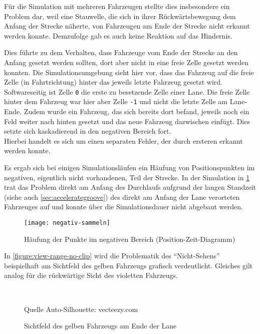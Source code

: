Für die Simulation mit mehreren Fahrzeugen stellte dies insbesondere ein Problem dar, weil eine Stauwelle, die sich in ihrer Rückwärtsbewegung dem Anfang der Strecke näherte, von Fahrzeugen am Ende der Strecke nicht erkannt werden konnte.
Demzufolge gab es auch keine Reaktion auf das Hindernis.

Dies führte zu dem Verhalten, dass Fahrzeuge vom Ende der Strecke an den Anfang gesetzt werden sollten, dort aber nicht in eine freie Zelle gesetzt werden konnten.
Die Simulationsumgebung sieht hier vor, dass das Fahrzeug auf die freie Zelle (in Fahrtrichtung) hinter das jeweils letzte Fahrzeug gesetzt wird.
\\
Softwareseitig ist Zelle \texttt{0} die erste zu besetzende Zelle einer Lane. Die freie Zelle hinter dem Fahrzeug war hier aber Zelle \texttt{-1} und nicht die letzte Zelle am Lane-Ende.
Zudem wurde ein Fahrzeug, das sich bereits dort befand, jeweils noch ein Feld weiter nach hinten gesetzt und das neue Fahrzeug dazwischen einfügt.
Dies setzte sich kaskadierend in den negativen Bereich fort.
\\
Hierbei handelt es sich um einen separaten Fehler, der durch ersteren erkannt werden konnte.

Es ergab sich bei einigen Simulationsläufen ein Häufung von Positionspunkten im negativen, eigentlich nicht vorhandenen, Teil der Strecke.
In der Simulation in \cref{figure:negativ-sammeln} trat das Problem direkt am Anfang des Durchlaufs aufgrund der langen Standzeit (siehe auch \cref{sec:accelerategroove}) des direkt am Anfang der Lane verorteten Fahrzeuges auf und konnte über die Simulationsdauer nicht abgebaut werden.
\begin{figure}[hptb]
 \centering
 \texttt{[image: negativ-sammeln]}
 \caption[Punktehäufung im negativen Bereich]
 		 {Häufung der Punkte im negativen Bereich (Position-Zeit-Diagramm)}
 \label{figure:negativ-sammeln}
\end{figure} 

In \cref{figure:view-range-no-clip} wird die Problematik des \enquote{Nicht-Sehens} beispielhaft am Sichtfeld des gelben Fahrzeugs grafisch verdeutlicht. 
Gleiches gilt analog für die rückwärtige Sicht des violetten Fahrzeugs.

\begin{figure}[hptb]
  \centering
     \\
  \caption[Umbrechen des Sichtfelds eines Fahrzeugs am Ende der Lane]
          {Sichtfeld des gelben Fahrzeugs am Ende der Lane}
          {\footnotesize Quelle Auto-Silhouette: vecteezy.com}
  \label{figure:view-range-no-clip-clip}
\end{figure}

